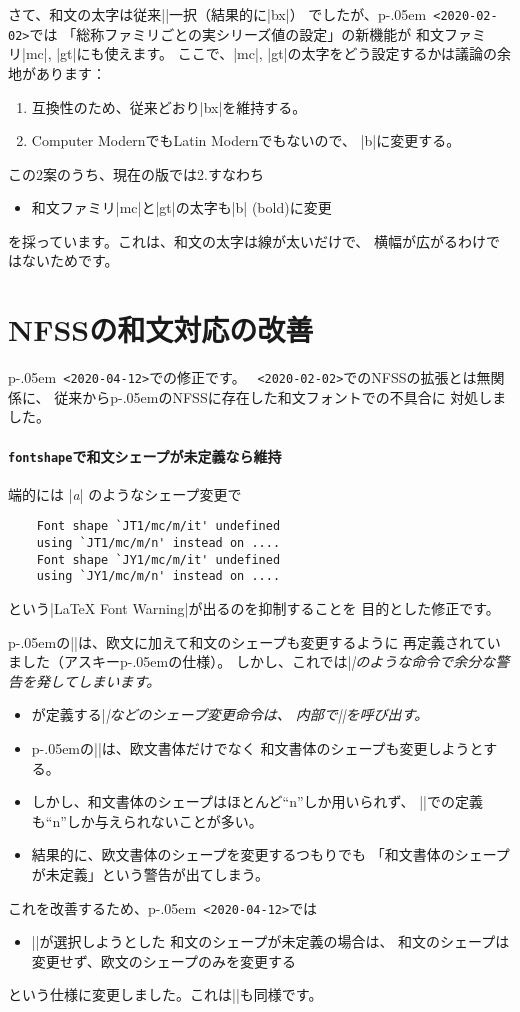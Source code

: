 \documentclass{plnews}
\def\cs#1{\texttt{\char92\nobreak #1}}
\def\pLaTeXe{p\kern-.05em\LaTeXe}
\begin{document}
さて、和文の太字は従来|\bfdefault|一択（結果的に|bx|）
でしたが、\pLaTeXe\ \texttt{<2020-02-02>}では
「総称ファミリごとの実シリーズ値の設定」の新機能が
和文ファミリ|mc|, |gt|にも使えます。
ここで、|mc|, |gt|の太字をどう設定するかは議論の余地があります：
\begin{enumerate}
 \item 互換性のため、従来どおり|bx|を維持する。
 \item Computer ModernでもLatin Modernでもないので、
   |b|に変更する。
\end{enumerate}
この2案のうち、現在の版では2.すなわち
\begin{itemize}
 \item 和文ファミリ|mc|と|gt|の太字も|b| (bold)に変更
\end{itemize}
を採っています。これは、和文の太字は線が太いだけで、
横幅が広がるわけではないためです。


\section{NFSSの和文対応の改善}
\pLaTeXe\ \texttt{<2020-04-12>}での修正です。
\LaTeXe\ \texttt{<2020-02-02>}でのNFSSの拡張とは無関係に、
従来から\pLaTeXe{}のNFSSに存在した和文フォントでの不具合に
対処しました。

\paragraph{\cs{fontshape}で和文シェープが未定義なら維持}
端的には |{\itshape a}| のようなシェープ変更で
\begin{verbatim}
    Font shape `JT1/mc/m/it' undefined
    using `JT1/mc/m/n' instead on ....
    Font shape `JY1/mc/m/it' undefined
    using `JY1/mc/m/n' instead on ....
\end{verbatim}
という|LaTeX Font Warning|が出るのを抑制することを
目的とした修正です。

\pLaTeXe{}の|\fontshape|は、欧文に加えて和文のシェープも変更するように
再定義されていました（アスキー\pLaTeXe{}の仕様）。
しかし、これでは|\itshape|のような命令で余分な警告を発してしまいます。
\begin{itemize}
 \item \LaTeXe{}が定義する|\itshape|などのシェープ変更命令は、
   内部で|\fontshape|を呼び出す。
 \item \pLaTeXe{}の|\fontshape|は、欧文書体だけでなく
   和文書体のシェープも変更しようとする。
 \item しかし、和文書体のシェープはほとんど``n''しか用いられず、
   |\DeclareFontShape|での定義も``n''しか与えられないことが多い。
 \item 結果的に、欧文書体のシェープを変更するつもりでも
   「和文書体のシェープが未定義」という警告が出てしまう。
\end{itemize}
これを改善するため、\pLaTeXe\ \texttt{<2020-04-12>}では
\begin{itemize}
 \item |\fontshape|が選択しようとした
   和文のシェープが未定義の場合は、
   和文のシェープは変更せず、欧文のシェープのみを変更する
\end{itemize}
という仕様に変更しました。これは|\fontshapeforce|も同様です。
\end{document}
